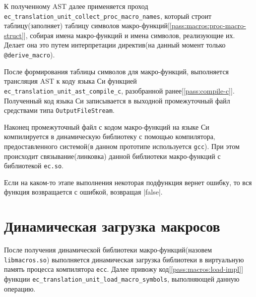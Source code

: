 К полученному AST далее применяется проход \newline\verb|ec_translation_unit_collect_proc_macro_names|, 
который строит таблицу(заполняет) таблицу символов макро-функций[\ref{pass:macros:proc-macro-struct}], 
собирая имена макро-функций и имена символов, реализующие их.
Делает она это путем интерпретации директив(на данный момент только \verb|@derive_macro|).

После формирования таблицы символов для макро-функций, выполняется трансляция AST к коду языка Си функцией \newline\verb|ec_translation_unit_ast_compile_c|, 
разобранной ранее[\ref{pass:compile-c}]. Полученный код языка Си записывается в выходной промежуточный файл средствами типа \verb|OutputFileStream|.

Наконец промежуточный файл с кодом макро-функций на языке Си компилируется в динамическую библиотеку с помощью компилятора, 
предоставленного системой(в данном прототипе используется \verb|gcc|).
При этом происходит связывание(линковка) данной библиотеки макро-функций с библиотекой \verb|ec.so|.

Если на каком-то этапе выполнения некоторая подфункция вернет ошибку, то вся функция возвращается с ошибкой, возвращая |false|.

\section{Динамическая загрузка макросов}
\label{pass:macros:load}

После получения динамической библиотеки макро-функций(назовем \verb|libmacros.so|) выполняется динамическая загрузка библиотеки в виртуальную память процесса компилятора \verb|ecc|.
Далее привожу код[\ref{pass:macros:load-impl}] функции \verb|ec_translation_unit_load_macro_symbols|, выполняющей данную операцию. 

